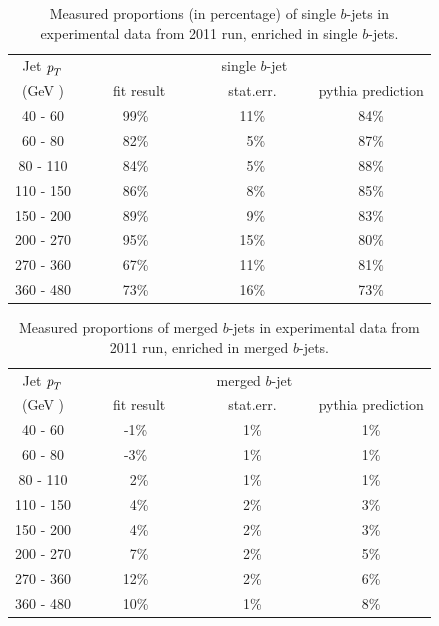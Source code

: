 \begin{table}[!hbt] %
\renewcommand{\arraystretch}{1.2}
\centering
\begin{tabular}{ | c || c | c | c ||}
  \hline
  Jet ${\emph{p}_{T}}$ & \multicolumn{3}{c||}{single $b$-jet}\\ \cline{2-4}
    (GeV ) & ~~~~fit result~~~ & ~~~~stat.err.~~~~ & pythia prediction \\ \hline
   40 - 60 &  99\%  &  11\%  &  84\% \\  
   60 - 80 &  82\%  &  ~5\%  &  87\% \\ 
   80 - 110&  84\%  &  ~5\%  &  88\% \\ 
  110 - 150&  86\%  &  ~8\%  &  85\% \\ 
  150 - 200&  89\%  &  ~9\%  &  83\% \\ 
  200 - 270&  95\%  &  15\%  &  80\% \\ 
  270 - 360&  67\%  &  11\%  &  81\% \\ 
  360 - 480&  73\%  &  16\%  &  73\% \\ \hline
\end{tabular}
\caption{Measured proportions (in percentage) of single $b$-jets in experimental data from 2011 run, enriched in single $b$-jets.}
\label{tb:fitfractions2btagS}
\end{table}

\begin{table}[!hbt] %
\renewcommand{\arraystretch}{1.2}
\centering
\begin{tabular}{ | c || c | c | c ||}
  \hline
  Jet ${\emph{p}_{T}}$ & \multicolumn{3}{c||}{merged $b$-jet}\\ \cline{2-4}
    (GeV ) & ~~~~fit result~~~ & ~~~~stat.err.~~~~ & pythia prediction \\ \hline
   40 - 60 &  -1\%  &  1\%  &  1\% \\  
   60 - 80 &  -3\%  &  1\%  &  1\% \\ 
   80 - 110&  ~2\%  &  1\%  &  1\% \\ 
  110 - 150&  ~4\%  &  2\%  &  3\% \\ 
  150 - 200&  ~4\%  &  2\%  &  3\% \\ 
  200 - 270&  ~7\%  &  2\%  &  5\% \\ 
  270 - 360&  12\%  &  2\%  &  6\% \\ 
  360 - 480&  10\%  &  1\%  &  8\% \\ \hline
\end{tabular}
\caption{Measured proportions of merged $b$-jets in experimental data from 2011 run, enriched in merged $b$-jets.}
\label{tb:fitfractions2btagM}
\end{table}

